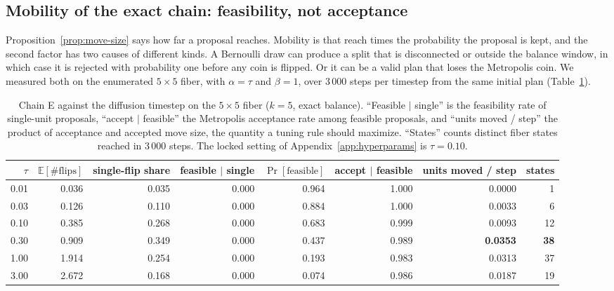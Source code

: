 \documentclass[11pt]{article}
\newcommand{\E}{\mathbb{E}}
\begin{document}
\subsection{Mobility of the exact chain: feasibility, not acceptance}\label{sec:mobility}

Proposition~\ref{prop:move-size} says how far a proposal reaches.
Mobility is that reach times the probability the proposal is kept,
and the second factor has two causes of different kinds. A Bernoulli
draw can produce a split that is disconnected or outside the balance
window, in which case it is rejected with probability one before any
coin is flipped. Or it can be a valid plan that loses the Metropolis
coin. We measured both on the enumerated $5 \times 5$ fiber, with
$\alpha = \tau$ and $\beta = 1$, over 3\,000 steps per timestep from
the same initial plan (Table~\ref{tab:mobility}).

\begin{table}[htbp]
\centering
\small
\setlength{\tabcolsep}{4pt}
\begin{tabular}{rrrrrrrr}
\toprule
$\tau$ & $\E[\#\mathrm{flips}]$ & single-flip share & feasible $\mid$ single
  & $\Pr[\text{feasible}]$ & accept $\mid$ feasible & units moved / step & states \\
\midrule
0.01 & 0.036 & 0.035 & 0.000 & 0.964 & 1.000 & 0.0000 & 1 \\
0.03 & 0.126 & 0.110 & 0.000 & 0.884 & 1.000 & 0.0033 & 6 \\
0.10 & 0.385 & 0.268 & 0.000 & 0.683 & 0.999 & 0.0093 & 12 \\
0.30 & 0.909 & 0.349 & 0.000 & 0.437 & 0.989 & \textbf{0.0353} & \textbf{38} \\
1.00 & 1.914 & 0.254 & 0.000 & 0.193 & 0.983 & 0.0313 & 37 \\
3.00 & 2.672 & 0.168 & 0.000 & 0.074 & 0.986 & 0.0187 & 19 \\
\bottomrule
\end{tabular}
\caption{Chain E against the diffusion timestep on the $5 \times 5$
  fiber ($k = 5$, exact balance). ``Feasible $\mid$ single'' is the
  feasibility rate of single-unit proposals, ``accept $\mid$
  feasible'' the Metropolis acceptance rate among feasible
  proposals, and ``units moved / step'' the product of acceptance and
  accepted move size, the quantity a tuning rule should maximize.
  ``States'' counts distinct fiber states reached in 3\,000 steps.
  The locked setting of Appendix~\ref{app:hyperparams} is
  $\tau = 0.10$.}\label{tab:mobility}
\end{table}
\end{document}
